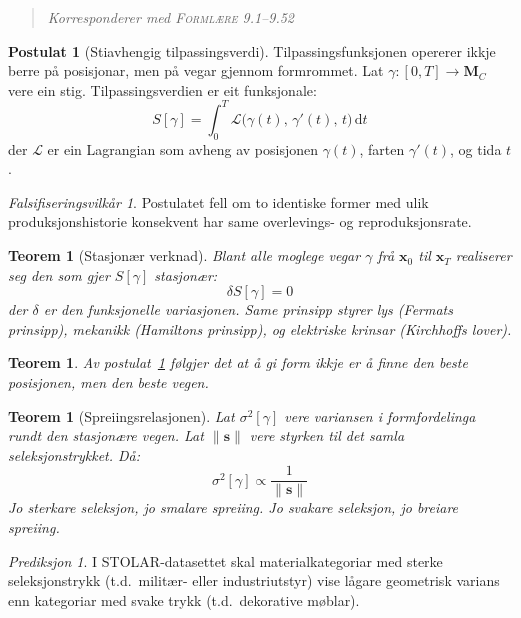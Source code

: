 \documentclass[11pt, a4paper]{article}
\theoremstyle{definition}
\newtheorem{postulat}[defn]{Postulat}
\theoremstyle{plain}
\newtheorem{teorem}[defn]{Teorem}
\theoremstyle{remark}
\newtheorem*{falsifisering}{Falsifiseringsvilk\aa r}
\newtheorem*{prediksjon}{Prediksjon}
\newcommand{\MC}{\mathbf{M}_C}
\newcommand{\x}{\mathbf{x}}
\newcommand{\svec}{\mathbf{s}}
\newcommand{\formlaere}{\textsc{Forml\ae re}}
\begin{document}
\begin{quote}
\itshape Korresponderer med \formlaere{} 9.1--9.52
\end{quote}

\begin{postulat}[Stiavhengig tilpassingsverdi]
\label{post:stiavhengig}
Tilpassingsfunksjonen opererer ikkje berre p\aa{} posisjonar, men p\aa{} vegar gjennom
formrommet. Lat $\gamma : [0, T] \to \MC$ vere ein stig. Tilpassingsverdien er eit
funksjonale:
\[
  S[\gamma] = \int_0^T \mathcal{L}\bigl(\gamma(t),\, \gamma'(t),\, t\bigr)\,\mathrm{d}t
\]
der $\mathcal{L}$ er ein Lagrangian som avheng av posisjonen $\gamma(t)$,
farten $\gamma'(t)$, og tida $t$.
\end{postulat}

\begin{falsifisering}
Postulatet fell om to identiske former med ulik produksjonshistorie konsekvent har same
overlevings- og reproduksjonsrate.
\end{falsifisering}

\begin{teorem}[Stasjon\ae r verknad]
\label{teo:stasjonaer}
Blant alle moglege vegar $\gamma$ fr\aa{} $\x_0$ til $\x_T$ realiserer seg den som gjer
$S[\gamma]$ stasjon\ae r:
\[
  \delta S[\gamma] = 0
\]
der $\delta$ er den funksjonelle variasjonen.
Same prinsipp styrer lys (Fermats prinsipp), mekanikk (Hamiltons prinsipp),
og elektriske krinsar (Kirchhoffs lover).
\end{teorem}

\begin{teorem}
\label{teo:veg}
Av postulat~\ref{post:stiavhengig} f\o lgjer det at \aa{} gi form ikkje er \aa{} finne
den beste posisjonen, men den beste \emph{vegen}.
\end{teorem}

\begin{teorem}[Spreiingsrelasjonen]
\label{teo:spreiing}
Lat $\sigma^2[\gamma]$ vere variansen i formfordelinga rundt den stasjon\ae re vegen.
Lat $\|\svec\|$ vere styrken til det samla seleksjonstrykket. D\aa:
\[
  \sigma^2[\gamma] \propto \frac{1}{\|\svec\|}
\]
Jo sterkare seleksjon, jo smalare spreiing.
Jo svakare seleksjon, jo breiare spreiing.
\end{teorem}

\begin{prediksjon}
I STOLAR-datasettet skal materialkategoriar med sterke seleksjonstrykk
(t.d.\ milit\ae r- eller industriutstyr) vise l\aa gare geometrisk varians enn
kategoriar med svake trykk (t.d.\ dekorative m\o blar).
\end{prediksjon}
\end{document}
